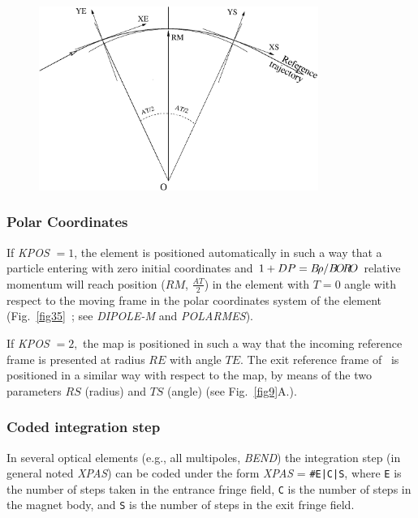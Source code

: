 \begin{figure}[H]
\begin{center}
~

~

\includegraphics[height=6cm]{Fig35.eps}
\end{center}
\end{figure}


\clearpage 

 \subsubsection*{Polar Coordinates} 
 
 If  \textsl{KPOS} $=1$,  the element is positioned automatically in such a way
that a particle entering with zero initial coordinates and 
$ 1+DP=B\!\rho /B\!O\!R\!O $ 
relative momentum will reach position ($ RM$, $\frac{AT }{ 2} $) in 
the element with $ T=0 $ angle with respect to the moving frame in the polar 
coordinates system of the element (Fig.~\ref{fig35}~; 
see \textsl{DIPOLE-M} and \textsl{POLARMES}).

\noindent If  \textsl{KPOS} $=2, $ the map is positioned in such a way that the 
incoming reference frame is presented  at radius $ RE $ with angle $ TE $.  
The exit reference frame of \zgou\  is positioned in a similar way with 
respect to the map,  by means of 
the two parameters $ RS $ (radius) and $ TS $ (angle) (see Fig.~\ref{fig9}A.).  






 \subsubsection{Coded integration step} 

In several optical elements (e.g., all multipoles, \textsl{BEND}) the 
integration step (in general noted \textsl{XPAS}) can be coded under the 
form \textsl{XPAS} = \texttt{\#E|C|S}, where \texttt{E} is the number of
steps taken in the entrance fringe field, \texttt{C} is the number of
steps in the magnet body, and \texttt{S} is the number of steps in the 
exit fringe field.

